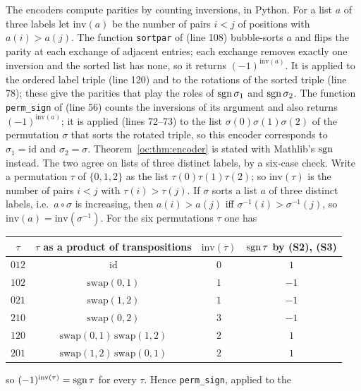 \begin{remark}\label{oc:rem:parity}
The encoders compute parities by counting inversions, in Python. For a list $a$ of three labels let
$\mathrm{inv}(a)$ be the number of pairs $i<j$ of positions with $a(i)>a(j)$. The function
\texttt{sortpar} of  (line 108) bubble-sorts $a$ and flips the parity at each
exchange of adjacent entries; each exchange removes exactly one inversion and the sorted list has none,
so it returns $(-1)^{\mathrm{inv}(a)}$. It is applied to the ordered label triple (line 120) and to the
rotations of the sorted triple (line 78); these give the parities that play the roles of
$\operatorname{sgn}\sigma_1$ and $\operatorname{sgn}\sigma_2$. The function \texttt{perm\_sign} of 
(line 56) counts the inversions of its argument and also returns $(-1)^{\mathrm{inv}(a)}$; it is
applied (lines 72--73) to the list $\sigma(0)\sigma(1)\sigma(2)$ of the permutation $\sigma$ that sorts
the rotated triple, so this encoder corresponds to $\sigma_1=\mathrm{id}$ and $\sigma_2=\sigma$.
Theorem~\ref{oc:thm:encoder} is stated with Mathlib's $\operatorname{sgn}$ instead. The two agree on lists of three
distinct labels, by a six-case check. Write a permutation $\tau$ of $\{0,1,2\}$ as the list $\tau(0)\tau(1)\tau(2)$; so
$\mathrm{inv}(\tau)$ is the number of pairs $i<j$ with $\tau(i)>\tau(j)$. If $\sigma$ sorts a list $a$ of
three distinct labels, i.e.\ $a\circ\sigma$ is increasing, then $a(i)>a(j)$ iff
$\sigma^{-1}(i)>\sigma^{-1}(j)$, so $\mathrm{inv}(a)=\mathrm{inv}(\sigma^{-1})$. For the six
permutations $\tau$ one has
\begin{center}
\begin{tabular}{cccc}
\toprule
$\tau$ & $\tau$ as a product of transpositions & $\mathrm{inv}(\tau)$ & $\operatorname{sgn}\tau$ by (S2), (S3)\\
\midrule
$012$ & $\mathrm{id}$ & $0$ & $1$\\
$102$ & $\mathrm{swap}(0,1)$ & $1$ & $-1$\\
$021$ & $\mathrm{swap}(1,2)$ & $1$ & $-1$\\
$210$ & $\mathrm{swap}(0,2)$ & $3$ & $-1$\\
$120$ & $\mathrm{swap}(0,1)\,\mathrm{swap}(1,2)$ & $2$ & $1$\\
$201$ & $\mathrm{swap}(1,2)\,\mathrm{swap}(0,1)$ & $2$ & $1$\\
\bottomrule
\end{tabular}
\end{center}
so $(-1)^{\mathrm{inv}(\tau)}=\operatorname{sgn}\tau$ for every $\tau$. Hence \texttt{perm\_sign}, applied to the

\end{remark}
